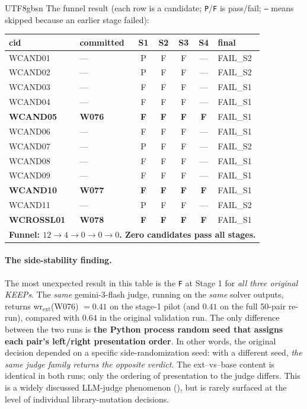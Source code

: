 \documentclass{article}
\begin{document}
\begin{CJK*}{UTF8}{gbsn}
The funnel result (each row is a candidate; \texttt{P}/\texttt{F}
is pass/fail; \texttt{—} means skipped because an earlier stage
failed):

\begin{center}\small
\begin{tabular}{l l c c c c l}
  \toprule
  cid & committed & S1 & S2 & S3 & S4 & final \\
  \midrule
  WCAND01   & ---  & P & F & F & — & FAIL\_S2 \\
  WCAND02   & ---  & P & F & F & — & FAIL\_S2 \\
  WCAND03   & ---  & F & F & F & — & FAIL\_S1 \\
  WCAND04   & ---  & F & F & F & — & FAIL\_S1 \\
  \textbf{WCAND05}   & \textbf{W076} & \textbf{F} & \textbf{F} & \textbf{F} & \textbf{F} & FAIL\_S1 \\
  WCAND06   & ---  & F & F & F & — & FAIL\_S1 \\
  WCAND07   & ---  & P & F & F & — & FAIL\_S2 \\
  WCAND08   & ---  & F & F & F & — & FAIL\_S1 \\
  WCAND09   & ---  & F & F & F & — & FAIL\_S1 \\
  \textbf{WCAND10}   & \textbf{W077} & \textbf{F} & \textbf{F} & \textbf{F} & \textbf{F} & FAIL\_S1 \\
  WCAND11   & ---  & P & F & F & — & FAIL\_S2 \\
  \textbf{WCROSSL01} & \textbf{W078} & \textbf{F} & \textbf{F} & \textbf{F} & \textbf{F} & FAIL\_S1 \\
  \midrule
  \multicolumn{7}{l}{\textbf{Funnel: $12 \to 4 \to 0 \to 0 \to 0$. Zero
    candidates pass all stages.}} \\
  \bottomrule
\end{tabular}
\end{center}

\paragraph{The side-stability finding.} The most unexpected result
in this table is the \texttt{F} at Stage 1 for \emph{all three
original KEEPs}. The \emph{same} gemini-3-flash judge, running on
the \emph{same} solver outputs, returns
wr\(_{\text{ext}}\)(W076) \(= 0.41\) on the stage-1 pilot (and
\(0.41\) on the full 50-pair re-run), compared with \(0.64\) in
the original validation run. The only difference between the two
runs is \textbf{the Python process random seed that assigns
each pair's left/right presentation order}. In other words, the
original decision depended on a specific side-randomization
seed: with a different seed, \emph{the same judge family returns
the opposite verdict}. The ext--vs--base content is identical in
both runs; only the ordering of presentation to the judge
differs. This is a widely discussed LLM-judge phenomenon
(\cite{zheng2023judging}), but is rarely
surfaced at the level of individual library-mutation decisions.


\end{CJK*}
\end{document}
